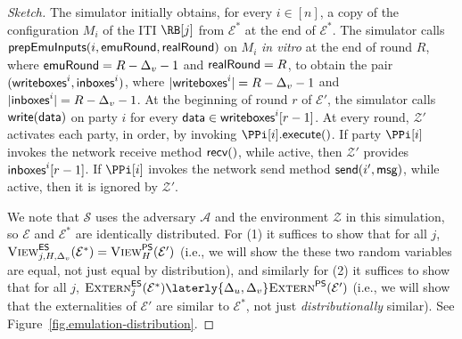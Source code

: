 \begin{proof}[Sketch]
  The simulator initially obtains, for every $i \in [n]$,
  a copy of the configuration $M_i$ of the ITI $\RB[j]$ from $\mathcal{E}^*$ at the end of
  $\mathcal{E}^*$.
  The simulator calls $\textsf{prepEmuInputs}(i, \textsf{emuRound}, \textsf{realRound})$ on $M_i$
  \emph{in vitro} at the end of round $R$, where $\textsf{emuRound} = R - \Delta_v - 1$
  and $\textsf{realRound} = R$, to obtain the pair
  $(\textsf{writeboxes}^i, \textsf{inboxes}^i)$, where
  $|\textsf{writeboxes}^i| = R - \Delta_v - 1$
  and
  $|\textsf{inboxes}^i| = R - \Delta_v - 1$.
  At the beginning of round $r$ of $\mathcal{E}'$, the simulator calls
  $\textsf{write}(\textsf{data})$ on party $i$
  for every $\textsf{data} \in \textsf{writeboxes}^i[r - 1]$.
  At every round, $\mathcal{Z}'$ activates each party, in order,
  by invoking $\PPi[i].\execute()$.
  If party $\PPi[i]$ invokes the network receive method $\textsf{recv}()$, while active,
  then $\mathcal{Z}'$ provides $\textsf{inboxes}^i[r - 1]$.
  If $\PPi[i]$ invokes the network send method $\textsf{send}(i', \textsf{msg})$, while active,
  then it is ignored by $\mathcal{Z}'$.


  We note that $\mathcal{S}$ uses the adversary $\mathcal{A}$ and the
  environment $\mathcal{Z}$ in this simulation, so $\mathcal{E}$
  and $\mathcal{E}^*$ are identically distributed.
  For (1) it suffices to show that for all $j$,
  $\textsc{View}^{\textsf{ES}}_{j,H,\Delta_v}(\mathcal{E}^*) = \textsc{View}^{\textsf{PS}}_H(\mathcal{E}')$
  (i.e., we will show the these two random variables are equal,
  not just equal by distribution),
  and similarly for (2) it suffices to show that for all $j$,
  $\LCExtern_j(\mathcal{E}^*) \laterly{\Delta_u,\Delta_v} \PEExtern(\mathcal{E}')$
  (i.e., we will show that the externalities of $\mathcal{E}'$ are
  similar to $\mathcal{E}^*$, not just \emph{distributionally} similar).
  See Figure~\ref{fig.emulation-distribution}.


\end{proof}
